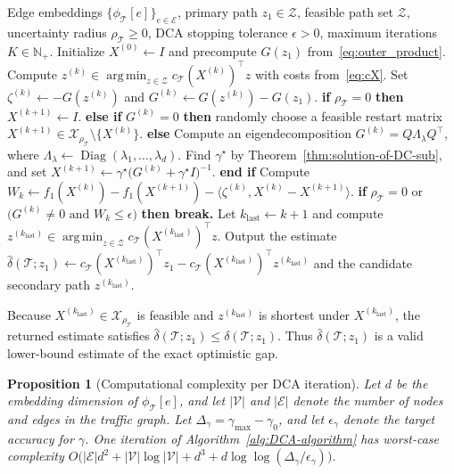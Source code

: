 \documentclass[11pt, letterpaper, oneside, reqno]{amsart}
\DeclareMathOperator{\Diag}{Diag}
\DeclareMathOperator*{\argmin}{arg\,min}
\newcommand{\opt}{^\star}
\newcommand{\inner}[2]{\big \langle #1, #2 \big \rangle }
\newtheorem{proposition}{Proposition}
\begin{document}
\begin{algorithm}[ht]
\caption{Difference-of-Convex Algorithm for estimating the optimistic time gap in~\eqref{eq:DC}}
\label{alg:DCA-algorithm}
\begin{algorithmic}[1]
\Require Edge embeddings $\{\phi_{\mathcal T}[e]\}_{e\in\mathcal E}$, primary path $z_1\in\mathcal Z$, feasible path set $\mathcal Z$, uncertainty radius $\rho_{\mathcal T}\ge0$, DCA stopping tolerance $\epsilon>0$, maximum iterations $K\in\mathbb N_+$.
\State Initialize $X^{(0)} \gets I$ and precompute $G(z_1)$ from~\eqref{eq:outer_product}.
    \State Compute $z^{(k)} \in \argmin_{z\in\mathcal Z} c_{\mathcal T}(X^{(k)})^\top z$ with costs from~\eqref{eq:cX}.
    \State Set $\zeta^{(k)}\gets -G(z^{(k)})$ and $G^{(k)}\gets G(z^{(k)})-G(z_1)$.
    \State \textbf{if} $\rho_{\mathcal T}=0$ \textbf{then} $X^{(k+1)}\gets I$.
    \State \textbf{else if} $G^{(k)}=0$ \textbf{then} randomly choose a feasible restart matrix $X^{(k+1)}\in\mathcal X_{\rho_{\mathcal T}}\setminus\{X^{(k)}\}$.
    \State \textbf{else}
        \State \;\;\quad Compute an eigendecomposition $G^{(k)} = Q\Lambda_\lambda Q^\top$, where $\Lambda_\lambda\gets\Diag(\lambda_1,\dots,\lambda_d)$.
        \State \;\;\quad Find $\gamma\opt$ by Theorem~\ref{thm:solution-of-DC-sub}, and set $X^{(k+1)}\gets \gamma\opt\bigl(G^{(k)}+\gamma\opt I\bigr)^{-1}$.
    \State \textbf{end if}
    \State Compute $W_k\gets f_1(X^{(k)})-f_1(X^{(k+1)})-\inner{\zeta^{(k)}}{X^{(k)}-X^{(k+1)}}$.
    \State \textbf{if} $\rho_{\mathcal T}=0$ or $\bigl(G^{(k)}\neq 0 \text{ and } W_k\le\epsilon\bigr)$ \textbf{ then break.}
\EndFor
\State Let $k_{\mathrm{last}}\gets k+1$ and compute $z^{(k_{\mathrm{last}})} \in \argmin_{z\in\mathcal Z} c_{\mathcal T}(X^{(k_{\mathrm{last}})})^\top z$.
\State Output the estimate $\widehat{\delta}(\mathcal T; z_1)\gets c_{\mathcal T}(X^{(k_{\mathrm{last}})})^\top z_1 - c_{\mathcal T}(X^{(k_{\mathrm{last}})})^\top z^{(k_{\mathrm{last}})}$ and the candidate secondary path $z^{(k_{\mathrm{last}})}$.
\end{algorithmic}
\end{algorithm}
Because $X^{(k_{\mathrm{last}})}\in\mathcal X_{\rho_{\mathcal T}}$ is feasible and $z^{(k_{\mathrm{last}})}$ is shortest under $X^{(k_{\mathrm{last}})}$, the returned estimate satisfies $\widehat{\delta}(\mathcal T; z_1) \leq \delta(\mathcal T; z_1)$. Thus $\widehat{\delta}(\mathcal T; z_1)$ is a valid lower-bound estimate of the exact optimistic gap.

\begin{proposition}[Computational complexity per DCA iteration]
\label{prop:complexity}
Let $d$ be the embedding dimension of $\phi_{\mathcal T}[e]$, and let $|\mathcal V|$ and $|\mathcal E|$ denote the number of nodes and edges in the traffic graph. Let $\Delta_\gamma = \gamma_{\max} - \gamma_0$, and let $\epsilon_\gamma$ denote the target accuracy for $\gamma$. One iteration of Algorithm~\ref{alg:DCA-algorithm} has worst-case complexity $O\bigl(|\mathcal E| d^2 + |\mathcal V| \log |\mathcal V| + d^3 + d \log\log(\Delta_\gamma/\epsilon_\gamma)\bigr)$.
\end{proposition}
\end{document}
